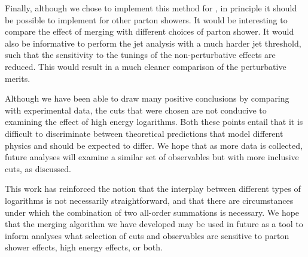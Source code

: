 Finally, although we chose to implement this method for \pyt, in 
principle it should be possible to implement for other parton showers.  
It would be interesting to compare the effect of merging \HEJ with different choices of parton shower. 
It would also be informative to perform the jet analysis with a much harder
jet threshold, such that the sensitivity to the tunings of the
non-perturbative effects are reduced. This would result in a much cleaner
comparison of the perturbative merits.


Although we have been able to draw many positive conclusions by comparing with experimental data, the 
cuts that were chosen are not conducive to examining the effect of high energy logarithms. Both these points entail that it is difficult to discriminate 
between theoretical predictions that model different physics and should be expected to differ. 
We hope that as more data is collected, future analyses will examine a
similar set of observables but with more inclusive cuts, as discussed.

This work has reinforced the notion that the interplay between different types of logarithms is not necessarily straightforward, and that there are circumstances under which
the combination of two all-order summations is necessary. We hope that the merging algorithm we have developed may be used in future as a tool to inform 
analyses what selection of cuts and observables are sensitive to parton shower effects, high energy effects, or both. 

